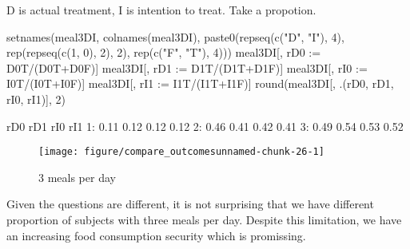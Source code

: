 \textsf{D} is actual treatment, \textsf{I} is intention to treat. Take a propotion.
\begin{Schunk}
\begin{Sinput}
setnames(meal3DI, colnames(meal3DI), 
	paste0(repseq(c("D", "I"), 4), rep(repseq(c(1, 0), 2), 2), rep(c("F", "T"), 4)))
meal3DI[, rD0 := D0T/(D0T+D0F)]
meal3DI[, rD1 := D1T/(D1T+D1F)]
meal3DI[, rI0 := I0T/(I0T+I0F)]
meal3DI[, rI1 := I1T/(I1T+I1F)]
round(meal3DI[, .(rD0, rD1, rI0, rI1)], 2)
\end{Sinput}
\begin{Soutput}
    rD0  rD1  rI0  rI1
1: 0.11 0.12 0.12 0.12
2: 0.46 0.41 0.42 0.41
3: 0.49 0.54 0.53 0.52
\end{Soutput}
\end{Schunk}
\begin{Schunk}
\begin{figure}

{\centering \texttt{[image: figure/compare\_outcomesunnamed-chunk-26-1]} 

}

\caption[3 meals per day]{3 meals per day}\label{Figureunnamed-chunk-26}
\end{figure}
\end{Schunk}
Given the questions are different, it is not surprising that we have different proportion of subjects with three meals per day. Despite this limitation, we have an increasing food consumption security which is promissing.

